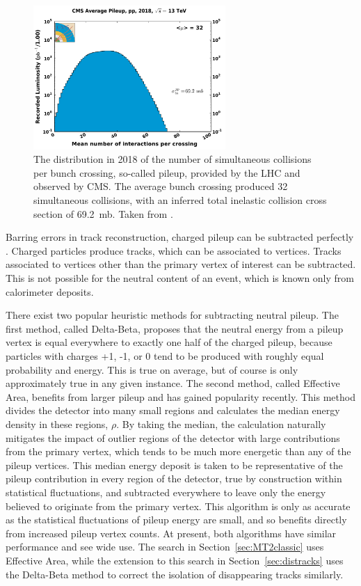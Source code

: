     \begin{figure}[h!]
      \centering
      \includegraphics[width=0.65\textwidth]{figures/pileup.pdf}
      \caption[Pileup distribution in 2018.]{
        The distribution in 2018 of the number of simultaneous collisions per bunch crossing, so-called pileup, provided by the LHC and observed by CMS.
        The average bunch crossing produced 32 simultaneous collisions, with an inferred total inelastic collision cross section of 69.2~mb.
        Taken from \cite{lumipublic}.}
      \label{fig:pileup}
    \end{figure}  

    Barring errors in track reconstruction, charged pileup can be subtracted perfectly \cite{pileup}.
    Charged particles produce tracks, which can be associated to vertices.
    Tracks associated to vertices other than the primary vertex of interest can be subtracted.
    This is not possible for the neutral content of an event, which is known only from calorimeter deposits.
    
    There exist two popular heuristic methods for subtracting neutral pileup.
    The first method, called Delta-Beta, proposes that the neutral energy from a pileup vertex is equal everywhere to exactly one half of the charged pileup, because particles with charges +1, -1, or 0 tend to be produced with roughly equal probability and energy.
    This is true on average, but of course is only approximately true in any given instance.
    The second method, called Effective Area, benefits from larger pileup and has gained popularity recently.
    This method divides the detector into many small regions and calculates the median energy density in these regions, $\rho$.
    By taking the median, the calculation naturally mitigates the impact of outlier regions of the detector with large contributions from the primary vertex, which tends to be much more energetic than any of the pileup vertices.
    This median energy deposit is taken to be representative of the pileup contribution in every region of the detector, true by construction within statistical fluctuations, and subtracted everywhere to leave only the energy believed to originate from the primary vertex.
    This algorithm is only as accurate as the statistical fluctuations of pileup energy are small, and so benefits directly from increased pileup vertex counts.
    At present, both algorithms have similar performance and see wide use.
    The search in Section~\ref{sec:MT2classic} uses Effective Area, while the extension to this search in Section~\ref{sec:distracks} uses the Delta-Beta method to correct the isolation of disappearing tracks similarly.

